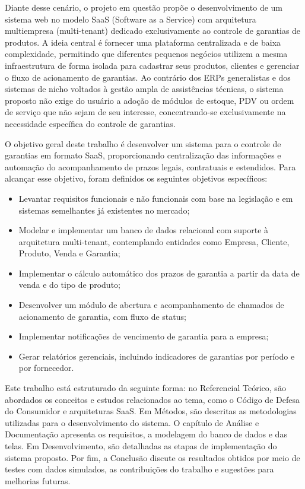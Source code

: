 Diante desse cenário, o projeto em questão propõe o desenvolvimento de um sistema web no modelo SaaS (Software as a Service) com arquitetura multiempresa (multi-tenant) dedicado exclusivamente ao controle de garantias de produtos. A ideia central é fornecer uma plataforma centralizada e de baixa complexidade, permitindo que diferentes pequenos negócios utilizem a mesma infraestrutura de forma isolada para cadastrar seus produtos, clientes e gerenciar o fluxo de acionamento de garantias. Ao contrário dos ERPs generalistas e dos sistemas de nicho voltados à gestão ampla de assistências técnicas, o sistema proposto não exige do usuário a adoção de módulos de estoque, PDV ou ordem de serviço que não sejam de seu interesse, concentrando-se exclusivamente na necessidade específica do controle de garantias.

O objetivo geral deste trabalho é desenvolver um sistema para o controle de garantias em formato SaaS, proporcionando centralização das informações e automação do acompanhamento de prazos legais, contratuais e estendidos. Para alcançar esse objetivo, foram definidos os seguintes objetivos específicos:

\begin{itemize}
	\item Levantar requisitos funcionais e não funcionais com base na legislação e em sistemas semelhantes já existentes no mercado;
	\item Modelar e implementar um banco de dados relacional com suporte à arquitetura multi-tenant, contemplando entidades como Empresa, Cliente, Produto, Venda e Garantia;
	\item Implementar o cálculo automático dos prazos de garantia a partir da data de venda e do tipo de produto;
	\item Desenvolver um módulo de abertura e acompanhamento de chamados de acionamento de garantia, com fluxo de status;
	\item Implementar notificações de vencimento de garantia para a empresa;
	\item Gerar relatórios gerenciais, incluindo indicadores de garantias por período e por fornecedor.
\end{itemize}

Este trabalho está estruturado da seguinte forma: no Referencial Teórico, são abordados os conceitos e estudos relacionados ao tema, como o Código de Defesa do Consumidor e arquiteturas SaaS. Em Métodos, são descritas as metodologias utilizadas para o desenvolvimento do sistema. O capítulo de Análise e Documentação apresenta os requisitos, a modelagem do banco de dados e das telas. Em Desenvolvimento, são detalhadas as etapas de implementação do sistema proposto. Por fim, a Conclusão discute os resultados obtidos por meio de testes com dados simulados, as contribuições do trabalho e sugestões para melhorias futuras.


